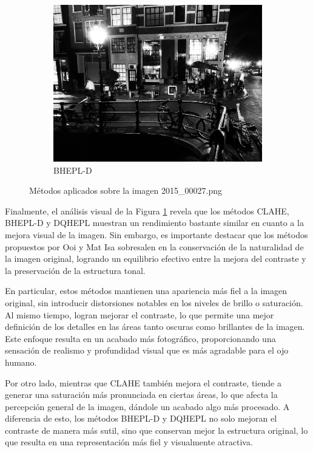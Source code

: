 \documentclass[sigchi]{acmart}
\begin{document}
\begin{figure}[htbp]
	\begin{subfigure}[b]{0.28\textwidth}
		\centering
		\includegraphics[width=\linewidth]{./procesadas/2015_00027/2015_00027_bhepl_d.png}
		\caption{BHEPL-D}
	\end{subfigure}

	\caption{Métodos aplicados sobre la imagen 2015\_00027.png}
	\label{fig:visual_027}
\end{figure}

Finalmente, el análisis visual de la Figura \ref{fig:visual_027} revela que los métodos CLAHE,
BHEPL-D y DQHEPL muestran un rendimiento bastante similar en cuanto a la mejora visual de la
imagen. Sin embargo, es importante destacar que los métodos propuestos por Ooi y Mat Isa
sobresalen en la conservación de la naturalidad de la imagen original, logrando un equilibrio
efectivo entre la mejora del contraste y la preservación de la estructura tonal.

En particular, estos métodos mantienen una apariencia más fiel a la imagen original, sin
introducir distorsiones notables en los niveles de brillo o saturación. Al mismo tiempo, logran
mejorar el contraste, lo que permite una mejor definición de los detalles en las áreas tanto
oscuras como brillantes de la imagen. Este enfoque resulta en un acabado más fotográfico,
proporcionando una sensación de realismo y profundidad visual que es más agradable para el ojo
humano.

Por otro lado, mientras que CLAHE también mejora el contraste, tiende a generar una saturación
más pronunciada en ciertas áreas, lo que afecta la percepción general de la imagen, dándole un
acabado algo más procesado. A diferencia de esto, los métodos BHEPL-D y DQHEPL no solo mejoran
el contraste de manera más sutil, sino que conservan mejor la estructura original, lo que
resulta en una representación más fiel y visualmente atractiva.
\end{document}
